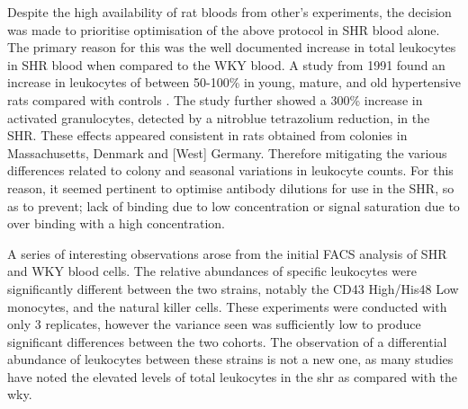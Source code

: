 
Despite the high availability of rat bloods from other’s experiments, the decision was made to prioritise optimisation of the above protocol in SHR blood alone. The primary reason for this was the well documented increase in total leukocytes in SHR blood when compared to the WKY blood. A study from 1991 found an increase in leukocytes of between 50-100\% in young, mature, and old hypertensive rats compared with controls \cite{Schmid-Schonbein1991a}. The study further showed a 300\% increase in activated granulocytes, detected by a nitroblue tetrazolium reduction, in the SHR. These effects appeared consistent in rats obtained from colonies in Massachusetts, Denmark and [West] Germany. Therefore mitigating the various differences related to colony and seasonal variations in leukocyte counts.  For this reason, it seemed pertinent to optimise antibody dilutions for use in the SHR, so as to prevent; lack of binding due to low concentration or signal saturation due to over binding with a high concentration. 

A series of interesting observations arose from the initial FACS analysis of SHR and WKY blood cells. The relative abundances of specific leukocytes were significantly different between the two strains, notably the CD43 High/His48 Low monocytes, and the natural killer cells. These experiments were conducted with only 3 replicates, however the variance seen was sufficiently low to produce significant differences between the two cohorts. The observation of a differential abundance of leukocytes between these strains is not a new one, as many studies have noted the elevated levels of total leukocytes in the \acrshort{shr} as compared with the \acrshort{wky}. 

